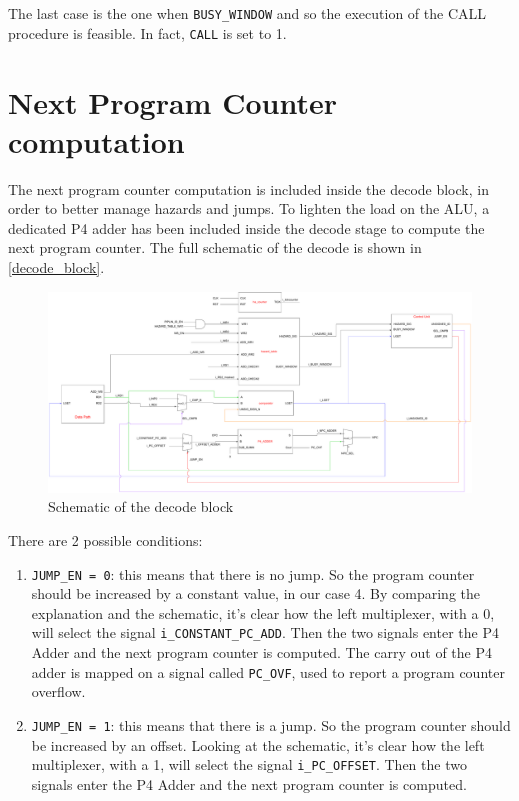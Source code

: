 The last case is the one when \texttt{BUSY\_WINDOW} and so the execution of the CALL procedure is feasible. In fact, \texttt{CALL} is set to 1.

\section{Next Program Counter computation}
The next program counter computation is included inside the decode block, in order to better manage hazards and jumps. To lighten the load on the ALU, a dedicated P4 adder has been included inside the decode stage to compute the next program counter. 
The full schematic of the decode is shown in \autoref{decode_block}.

\begin{figure}[H]
	\centering
  \addtolength{\leftskip}{-3cm}
  \addtolength{\rightskip}{-3cm}
	\includegraphics[width=1.2\textwidth]{chapters/4_DecodeStage/images/decode_block.pdf}
	\caption{Schematic of the decode block}
	\label{decode_block}
\end{figure}

There are 2 possible conditions:

\begin{enumerate}
  \item \texttt{JUMP\_EN = 0}: this means that there is no jump. So the program counter should be increased by a constant value, in our case 4. By comparing the explanation and the schematic, it's clear how the left multiplexer, with a 0, will select the signal \texttt{i\_CONSTANT\_PC\_ADD}. Then the two signals enter the P4 Adder and the next program counter is computed. The carry out of the P4 adder is mapped on a signal called \texttt{PC\_OVF}, used to report a program counter overflow. 
  \item \texttt{JUMP\_EN = 1}: this means that there is a jump. So the program counter should be increased by an offset. Looking at the schematic, it's clear how the left multiplexer, with a 1, will select the signal \texttt{i\_PC\_OFFSET}. Then the two signals enter the P4 Adder and the next program counter is computed. 
\end{enumerate}


